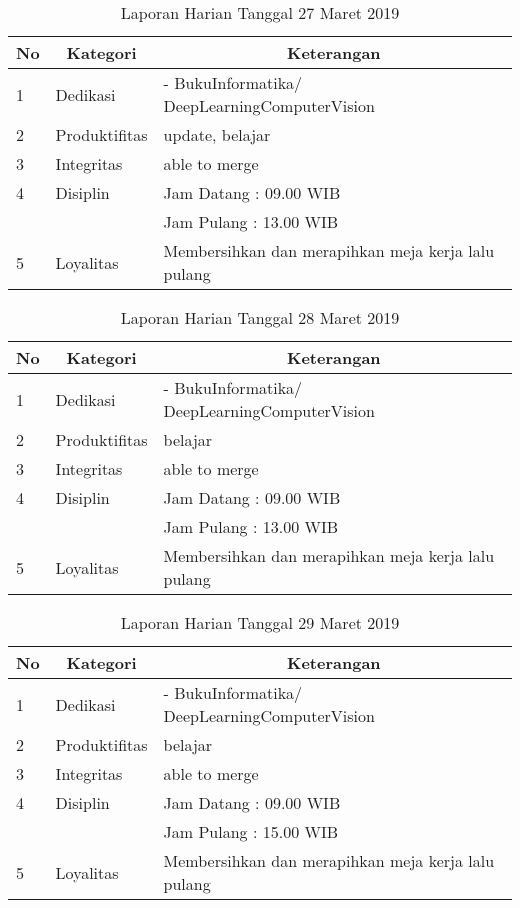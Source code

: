 \begin{table}[htp]
\caption{Laporan Harian Tanggal 27 Maret 2019}
\label{tab:lh270319}
\begin{tabular}{|l|l|l|}
\hline
\textbf{No} & \multicolumn{1}{c|}{\textbf{Kategori}} & \multicolumn{1}{c|}{\textbf{Keterangan}} \\ \hline
1 & Dedikasi & - BukuInformatika/ DeepLearningComputerVision \\ \hline
2 & Produktifitas & update, belajar  \\
3 & Integritas & able to merge \\ \hline
4 & Disiplin & Jam Datang : 09.00 WIB \\
 &  & Jam Pulang : 13.00 WIB \\ \hline
5 & Loyalitas & Membersihkan dan merapihkan meja kerja lalu pulang  \\ \hline
\end{tabular}
\end{table}

\begin{table}[htp]
\caption{Laporan Harian Tanggal 28 Maret 2019}
\label{tab:lh280319}
\begin{tabular}{|l|l|l|}
\hline
\textbf{No} & \multicolumn{1}{c|}{\textbf{Kategori}} & \multicolumn{1}{c|}{\textbf{Keterangan}} \\ \hline
1 & Dedikasi & - BukuInformatika/ DeepLearningComputerVision \\ \hline
2 & Produktifitas & belajar  \\
3 & Integritas & able to merge \\ \hline
4 & Disiplin & Jam Datang : 09.00 WIB \\
 &  & Jam Pulang : 13.00 WIB \\ \hline
5 & Loyalitas & Membersihkan dan merapihkan meja kerja lalu pulang  \\ \hline
\end{tabular}
\end{table}

\begin{table}[htp]
\caption{Laporan Harian Tanggal 29 Maret 2019}
\label{tab:lh290319}
\begin{tabular}{|l|l|l|}
\hline
\textbf{No} & \multicolumn{1}{c|}{\textbf{Kategori}} & \multicolumn{1}{c|}{\textbf{Keterangan}} \\ \hline
1 & Dedikasi & - BukuInformatika/ DeepLearningComputerVision \\ \hline
2 & Produktifitas & belajar  \\
3 & Integritas & able to merge \\ \hline
4 & Disiplin & Jam Datang : 09.00 WIB \\
 &  & Jam Pulang : 15.00 WIB \\ \hline
5 & Loyalitas & Membersihkan dan merapihkan meja kerja lalu pulang  \\ \hline
\end{tabular}
\end{table}

